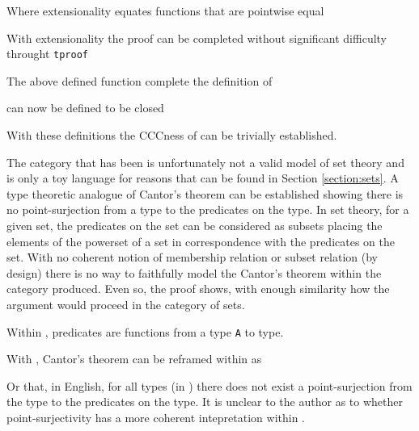 
Where extensionality equates functions that are pointwise equal


With extensionality the proof can be completed without significant difficulty
throught \verb|tproof|


The above defined function complete the definition of 


 can now be defined to be closed

With these definitions the CCCness of  can be trivially
established.

The category that has been is unfortunately not a valid model of set theory and
is only a toy language for reasons that can be found in Section
\ref{section:sets}.  A type theoretic analogue of Cantor's theorem can be
established showing there is no point-surjection from a type to the predicates
on the type. In set theory, for a given set, the predicates on the set can be
considered as subsets placing the elements of the powerset of a set in
correspondence with the predicates on the set. With no coherent notion of
membership relation or subset relation (by design) there is no way to faithfully
model the Cantor's theorem  within the category produced. Even so, the proof
shows, with enough similarity how the argument would proceed in the category of
sets.

Within , predicates are functions from a type \verb|A| to
 type.


With , Cantor's theorem can be reframed within
 as


Or that, in English, for all types (in ) there does not exist
a point-surjection from the type to the predicates on the type. It is unclear
to the author as to whether point-surjectivity has a more coherent intepretation
within .

